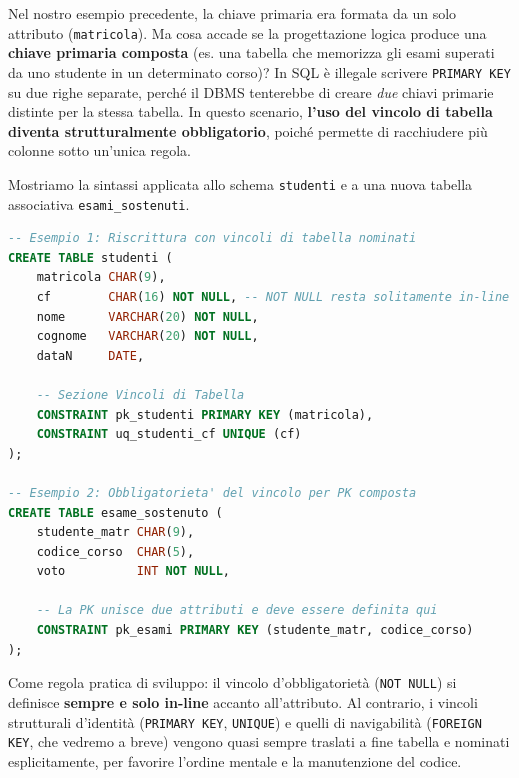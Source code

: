 Nel nostro esempio precedente, la chiave primaria era formata da un solo attributo (\texttt{matricola}). Ma cosa accade se la progettazione logica produce una \textbf{chiave primaria composta} (es. una tabella che memorizza gli esami superati da uno studente in un determinato corso)?
In SQL è illegale scrivere \texttt{PRIMARY KEY} su due righe separate, perché il DBMS tenterebbe di creare \textit{due} chiavi primarie distinte per la stessa tabella. In questo scenario, \textbf{l'uso del vincolo di tabella diventa strutturalmente obbligatorio}, poiché permette di racchiudere più colonne sotto un'unica regola.

\begin{example}
Mostriamo la sintassi applicata allo schema \texttt{studenti} e a una nuova tabella associativa \texttt{esami\_sostenuti}.

\begin{lstlisting}[language=SQL, basicstyle=\ttfamily\small, keywordstyle=\color{blue}\bfseries]
-- Esempio 1: Riscrittura con vincoli di tabella nominati
CREATE TABLE studenti (
    matricola CHAR(9),
    cf        CHAR(16) NOT NULL, -- NOT NULL resta solitamente in-line
    nome      VARCHAR(20) NOT NULL,
    cognome   VARCHAR(20) NOT NULL,
    dataN     DATE,
    
    -- Sezione Vincoli di Tabella
    CONSTRAINT pk_studenti PRIMARY KEY (matricola),
    CONSTRAINT uq_studenti_cf UNIQUE (cf)
);

-- Esempio 2: Obbligatorieta' del vincolo per PK composta
CREATE TABLE esame_sostenuto (
    studente_matr CHAR(9),
    codice_corso  CHAR(5),
    voto          INT NOT NULL,
    
    -- La PK unisce due attributi e deve essere definita qui
    CONSTRAINT pk_esami PRIMARY KEY (studente_matr, codice_corso)
);
\end{lstlisting}
\end{example}

\begin{bestpractice}
Come regola pratica di sviluppo: il vincolo d'obbligatorietà (\texttt{NOT NULL}) si definisce \textbf{sempre e solo in-line} accanto all'attributo. Al contrario, i vincoli strutturali d'identità (\texttt{PRIMARY KEY}, \texttt{UNIQUE}) e quelli di navigabilità (\texttt{FOREIGN KEY}, che vedremo a breve) vengono quasi sempre traslati a fine tabella e nominati esplicitamente, per favorire l'ordine mentale e la manutenzione del codice.
\end{bestpractice}


